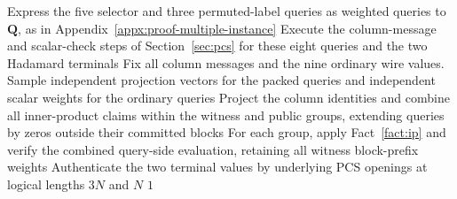 \begin{algorithm}[!t]
Express the five selector and three permuted-label queries as weighted
queries to \(\bm Q\), as in Appendix~\ref{appx:proof-multiple-instance}\;
Execute the column-message and scalar-check steps of Section~\ref{sec:pcs}
for these eight queries and the two Hadamard terminals\;
Fix all column messages and the nine ordinary wire values.
Sample independent projection vectors for the packed queries and
independent scalar weights for the ordinary queries\;
Project the column identities and combine all inner-product claims
within the witness and public groups, extending queries by zeros
outside their committed blocks\;
For each group, apply Fact~\ref{fact:ip} and verify the combined query-side
evaluation, retaining all witness block-prefix weights\;
Authenticate the two terminal values by underlying PCS openings
at logical lengths \(3N\) and \(N\)\;
\Return \(1\)\;
\end{algorithm}
